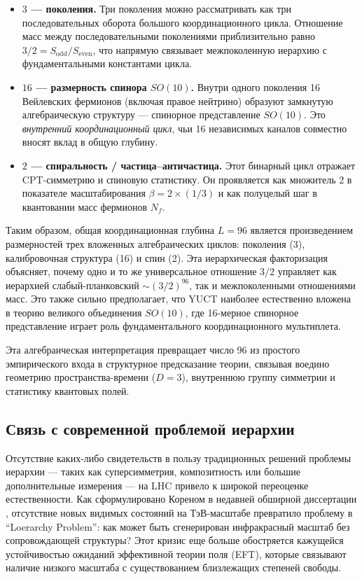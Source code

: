 \documentclass[11pt,a4paper]{article}
\newcommand{\Sodd}{S_{\mathrm{odd}}}
\newcommand{\Seven}{S_{\mathrm{even}}}
\begin{document}
	\begin{itemize}
		\item \textbf{\(3\) — поколения.} Три поколения можно рассматривать как три последовательных оборота большого координационного цикла. Отношение масс между последовательными поколениями приблизительно равно \(3/2 = \Sodd/\Seven\), что напрямую связывает межпоколенную иерархию с фундаментальными константами цикла.
		\item \textbf{\(16\) — размерность спинора \(SO(10)\).} Внутри одного поколения 16 Вейлевских фермионов (включая правое нейтрино) образуют замкнутую алгебраическую структуру — спинорное представление \(SO(10)\). Это \emph{внутренний координационный цикл}, чьи 16 независимых каналов совместно вносят вклад в общую глубину.
		\item \textbf{\(2\) — спиральность / частица–античастица.} Этот бинарный цикл отражает CPT-симметрию и спиновую статистику. Он проявляется как множитель 2 в показателе масштабирования \(\beta = 2 \times (1/3)\) и как полуцелый шаг в квантовании масс фермионов \(N_f\).
	\end{itemize}
	
	Таким образом, общая координационная глубина \(L = 96\) является произведением размерностей трех вложенных алгебраических циклов: поколения (3), калибровочная структура (16) и спин (2). Эта иерархическая факторизация объясняет, почему одно и то же универсальное отношение \(3/2\) управляет как иерархией слабый-планковский \(\sim (3/2)^{96}\), так и межпоколенными отношениями масс. Это также сильно предполагает, что YUCT наиболее естественно вложена в теорию великого объединения \(SO(10)\), где 16-мерное спинорное представление играет роль фундаментального координационного мультиплета.
	
	Эта алгебраическая интерпретация превращает число 96 из простого эмпирического входа в структурное предсказание теории, связывая воедино геометрию пространства-времени (\(D=3\)), внутреннюю группу симметрии и статистику квантовых полей.
	
	\subsection{Связь с современной проблемой иерархии}
	
	Отсутствие каких-либо свидетельств в пользу традиционных решений проблемы иерархии — таких как суперсимметрия, композитность или большие дополнительные измерения — на LHC привело к широкой переоценке естественности. Как сформулировано Кореном в недавней обширной диссертации \cite{Koren2020}, отсутствие новых видимых состояний на ТэВ-масштабе превратило проблему в ``Loerarchy Problem'': как может быть сгенерирован инфракрасный масштаб без сопровождающей структуры? Этот кризис еще больше обостряется кажущейся устойчивостью ожиданий эффективной теории поля (EFT), которые связывают наличие низкого масштаба с существованием близлежащих степеней свободы.
	
\end{document}
